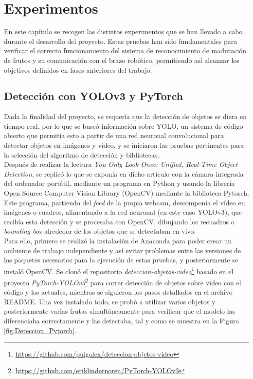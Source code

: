 \chapter{Experimentos}
\label{cap:capitulo6}

En este capítulo se recogen las distintos experimentos que se han llevado a cabo durante el desarrollo del proyecto. Estas pruebas han sido fundamentales para verificar el correcto funcionamiento del sistema de reconocimiento de maduración de frutos y su comunicación con el brazo robótico, permitiendo así alcanzar los objetivos definidos en fases anteriores del trabajo.

\section{Detección con YOLOv3 y PyTorch}
\label{exp_seleccion_algoritmo}

Dada la finalidad del proyecto, se requería que la detección de objetos se diera en tiempo real, por lo que se buscó información sobre YOLO, un sistema de código abierto que permitía esto a partir de una red neuronal convolucional para detectar objetos en imágenes y vídeo, y se iniciaron las pruebas pertinentes para la selección del algoritmo de detección y bibliotecas.\\

Después de realizar la lectura \textit{You Only Look Once: Unified, Real-Time Object Detection}\cite{Redmon16}, se replicó lo que se exponía en dicho artículo con la cámara integrada del ordenador portátil, mediante un programa en Python y usando la librería Open Source Computer Vision Library (OpenCV) mediante la biblioteca Pytorch. Este programa, partiendo del \textit{feed} de la propia webcam, descomponía el vídeo en imágenes o cuadros, alimentando a la red neuronal (en este caso YOLOv3), que recibía esta detección y se procesaba con OpenCV, dibujando los recuadros o \textit{bounding box} alrededor de los objetos que se detectaban en vivo.\\

Para ello, primero se realizó la instalación de Anaconda para poder crear un ambiente de trabajo independiente y así evitar problemas entre las versiones de los paquetes necesarios para la ejecución de estas pruebas, y posteriormente se instaló OpenCV. Se clonó el repositorio \textit{deteccion-objetos-video}\footnote{\url{https://github.com/puigalex/deteccion-objetos-video}} basado en el proyecto \textit{PyTorch-YOLOv3}\footnote{\url{https://github.com/eriklindernoren/PyTorch-YOLOv3}} para correr detección de objetos sobre video con el código y los actuales, mientras se siguieron los pasos detallados en el archivo README.
Una vez instalado todo, se probó a utilizar varios objetos y posteriormente varias frutas simultáneamente para verificar que el modelo las diferenciaba correctamente y las detectaba, tal y como se muestra en la Figura \ref{fig:Deteccion_Pytorch}.

